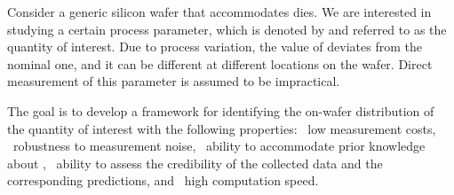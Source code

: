 Consider a generic silicon wafer that accommodates \nd dies. We are interested
in studying a certain process parameter, which is denoted by \g and referred to
as the quantity of interest. Due to process variation, the value of \g deviates
from the nominal one, and it can be different at different locations on the
wafer. Direct measurement of this parameter is assumed to be impractical.

The goal is to develop a framework for identifying the on-wafer distribution of
the quantity of interest \g with the following properties: \one~low measurement
costs, \two~robustness to measurement noise, \three~ability to accommodate prior
knowledge about \g, \four~ability to assess the credibility of the collected
data and the corresponding predictions, and \five~high computation speed.
